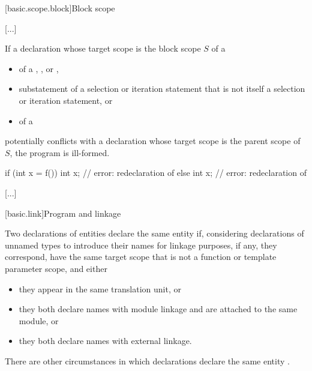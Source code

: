 \documentclass{wg21}
\begin{document}
{[basic.scope.block]{Block scope}

\textcolor{noteclr}{[...]}

\pnum
If a declaration  whose target scope is the block scope $S$ of a
\begin{itemize}
    \item
     of a ,
    , or ,
    \item
    substatement of a selection or iteration statement
    that is not itself a selection or iteration statement, or
    \item
     of a 
\end{itemize}
potentially conflicts with a declaration
whose target scope is the parent scope of $S$,
the program is ill-formed.
\begin{example}
    \begin{codeblock}
        if (int x = f()) {
            int x;            // error: redeclaration of 
        }
        else {
            int x;            // error: redeclaration of 
        }
    \end{codeblock}
\end{example}

\textcolor{noteclr}{[...]}

[basic.link]{Program and linkage}%


\pnum
Two declarations of entities declare the same entity
if, considering declarations of unnamed types to introduce their names
for linkage purposes, if any,
they correspond,
have the same target scope that is not a function or template parameter scope,
and either
\begin{itemize}
    \item
    they appear in the same translation unit, or
    \item
    they both declare names with module linkage and are attached to the same module, or
    \item
    they both declare names with external linkage.
\end{itemize}
\begin{note}
    There are other circumstances in which declarations declare the same entity%
    .
\end{note}

}
\end{document}
